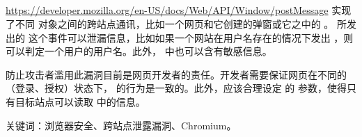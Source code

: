 \subsection{}

\url{https://developer.mozilla.org/en-US/docs/Web/API/Window/postMessage}  实现了不同  对象之间的跨站点通讯，比如一个网页和它创建的弹窗或它之中的 。 所发出的  这个事件可以泄漏信息，比如如果一个网站在用户名存在的情况下发出 ，则可以判定一个用户的用户名。此外， 中也可以含有敏感信息。

防止攻击者滥用此漏洞目前是网页开发者的责任。开发者需要保证网页在不同的（登录、授权）状态下， 的行为是一致的。此外，应该合理设定  的   参数，使得只有目标站点可以读取  中的信息。

关键词：浏览器安全、跨站点泄露漏洞、Chromium。